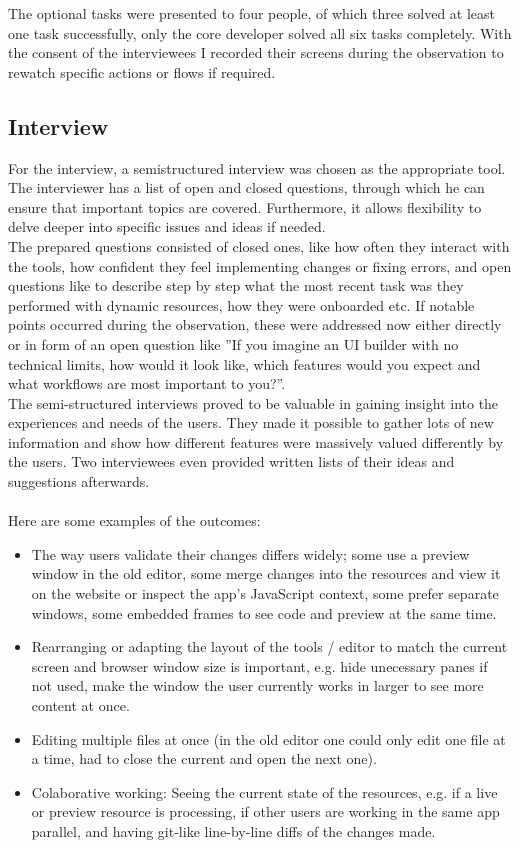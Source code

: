 The optional tasks were presented to four people, of which three solved at least one task successfully, only the core developer solved all six tasks completely.
With the consent of the interviewees I recorded their screens during the observation to rewatch specific actions or flows if required.

\subsection{Interview}
\label{subsec:interview}
For the interview, a semistructured interview was chosen as the appropriate tool.
The interviewer has a list of open and closed questions, through which he can ensure that important topics are covered.
Furthermore, it allows flexibility to delve deeper into specific issues and ideas if needed.
\\
The prepared questions consisted of closed ones, like how often they interact with the tools, how confident they feel implementing changes or fixing errors, and open questions like to describe step by step what the most recent task was they performed with dynamic resources, how they were onboarded etc.
If notable points occurred during the observation, these were addressed now either directly or in form of an open question like ''If you imagine an UI builder with no technical limits, how would it look like, which features would you expect and what workflows are most important to you?''.
\\
The semi-structured interviews proved to be valuable in gaining insight into the experiences and needs of the users. They made it possible to gather lots of new information and show how different features were massively valued differently by the users. Two interviewees even provided written lists of their ideas and suggestions afterwards.
\\\\
Here are some examples of the outcomes:
\begin{itemize}
  \item The way users validate their changes differs widely; some use a preview window in the old editor, some merge changes into the resources and view it on the website or inspect the app's JavaScript context, some prefer separate windows, some embedded frames to see code and preview at the same time.
  \item Rearranging or adapting the layout of the tools / editor to match the current screen and browser window size is important, e.g. hide unecessary panes if not used, make the window the user currently works in larger to see more content at once.
  \item Editing multiple files at once (in the old editor one could only edit one file at a time, had to close the current and open the next one).
  \item Colaborative working: Seeing the current state of the resources, e.g. if a live or preview resource is processing, if other users are working in the same app parallel, and having git-like line-by-line diffs of the changes made.
\end{itemize}


